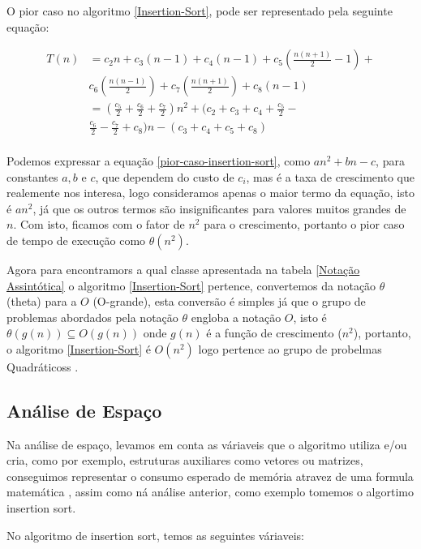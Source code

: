 \documentclass[
	12pt,				%
	openright,			%
	oneside,			%
	a4paper,			%
	english,			%
	brazil				%
	]{abntex2}
\begin{document}
O pior caso no algoritmo \ref{Insertion-Sort}, pode ser representado pela seguinte equação:

\begin{equation}
	\label{pior-caso-insertion-sort}
	\begin{split}
		T(n)&= c_2n + c_3(n - 1) + c_4(n - 1) + c_5(\frac{n(n+1)}{2}-1) + \\ 
			&c_6(\frac{n(n-1)}{2}) + c_7(\frac{n(n+1)}{2}) + c_8(n-1) \\
			&= (\frac{c_5}{2} + \frac{c_6}{2} + \frac{c_7}{2})n^2 + (c_2 + c_3 + c_4 + \frac{c_5}{2} - \\
			&\frac{c_6}{2} - \frac{c_7}{2} + c_8)n - (c_3 + c_4 + c_5 + c_8) \\
	\end{split}
\end{equation}

Podemos expressar a equação \ref{pior-caso-insertion-sort}, como $an^2 + bn - c$, para constantes $a, b$ e $c$, que dependem do custo de
$c_i$, mas é a taxa de crescimento que realemente nos interesa, logo consideramos apenas o maior termo da equação, isto é $an^2$, já que
os outros termos são insignificantes para valores muitos grandes de $n$. Com isto, ficamos com o fator de $n^2$ para o crescimento, portanto
o pior caso de tempo de execução como $\theta(n^2)$.

Agora para encontramors a qual classe apresentada na tabela \ref{Notação Assintótica} o algoritmo \ref{Insertion-Sort} pertence, convertemos
da notação $\theta$ (theta) para a $O$ (O-grande), esta conversão é simples já que o grupo de problemas abordados pela notação $\theta$ engloba
a notação $O$, isto é $\theta(g(n)) \subseteq O(g(n))$ onde $g(n)$ é a função de crescimento ($n^2$), portanto, o algoritmo \ref{Insertion-Sort}
é $O(n^2)$ logo pertence ao grupo de probelmas Quadráticoss \cite{introductionAlgorthms}.

\subsection{Análise de Espaço}

Na análise de espaço, levamos em conta as váriaveis que o algoritmo utiliza e/ou cria, como por exemplo, estruturas
auxiliares como vetores ou matrizes, conseguimos representar o consumo esperado de memória atravez de uma formula
matemática \cite{introductionAnalysis}, assim como ná análise anterior, como exemplo tomemos o algortimo insertion sort.

No algoritmo de insertion sort, temos as seguintes váriaveis:
\end{document}
